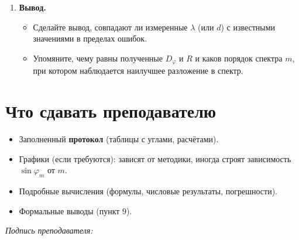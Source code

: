 \documentclass[a4paper,12pt]{article}
\begin{document}
\begin{enumerate}
  \item \textbf{Вывод.} 
  \begin{itemize}
    \item Сделайте вывод, совпадают ли измеренные $\lambda$ (или $d$) с известными значениями в пределах ошибок.
    \item Упомяните, чему равны полученные $D_{\varphi}$ и $R$ и каков порядок спектра $m$, при котором наблюдается наилучшее разложение в спектр.
  \end{itemize}
\end{enumerate}

\section*{Что сдавать преподавателю}
\begin{itemize}
  \item Заполненный \textbf{протокол} (таблицы с углами, расчётами).
  \item Графики (если требуются): зависят от методики, иногда строят зависимость $\sin \varphi_m$ от $m$.
  \item Подробные вычисления (формулы, числовые результаты, погрешности).
  \item Формальные выводы (пункт 9).
\end{itemize}

\vfill
\textit{Подпись преподавателя:} \hrulefill
\end{document}
